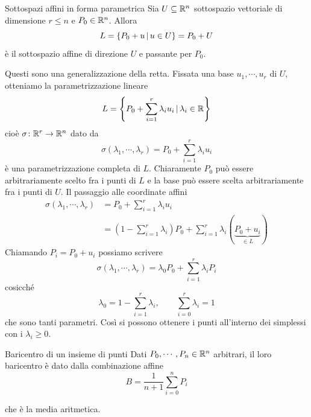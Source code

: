 \documentclass[a4paper]{article}
\begin{document}
\begin{snippetdefinition}{Sottospazi affini in forma parametrica}
    Sia \(U \subseteq \mathbb{R}^n\) sottospazio vettoriale di dimensione \(r \leq n\)
    e \(P_0 \in \mathbb{R}^n\).
    Allora
    \[
        L = \left\{
            P_0 + u \,|\, u \in U
        \right\} = P_0 + U
    \]
    è il sottospazio affine
    di direzione \(U\) e passante per \(P_0\).
\end{snippetdefinition}

Questi sono una generalizzazione della retta.
Fissata una base \(u_1, \cdots, u_r\) di \(U\),
otteniamo la parametrizzazione lineare
\[
    L = \left\{
        P_0 + \sum_{i=1}^r \lambda_i u_i
        \,|\, \lambda_i \in \mathbb{R}
    \right\}
\]
cioè \(\sigma \colon \mathbb{R}^r \to \mathbb{R}^n\)
dato da
\[
    \sigma(\lambda_1, \cdots, \lambda_r) = P_0 + \sum_{i=1}^r \lambda_i u_i
\]
è una parametrizzazione completa di \(L\).
Chiaramente \(P_0\) può essere arbitrariamente scelto fra i punti di \(L\)
e la base può essere scelta arbitrariamente fra i punti di \(U\).
Il passaggio alle coordinate affini
\begin{align*}
    \sigma(\lambda_1, \cdots, \lambda_r)
    &= P_0 + \sum_{i=1}^r \lambda_i u_i \\
    &= \left(1 - \sum_{i=1}^r \lambda_i\right) P_0
    + \sum_{i=1}^r \lambda_i(\underbrace{P_0 + u_i}_{\in L})
\end{align*}
Chiamando \(P_i = P_0 + u_i\) possiamo scrivere
\[
    \sigma(\lambda_1, \cdots, \lambda_r) = \lambda_0 P_0 + \sum_{i=1}^r \lambda_i P_i
\]
cosicché
\[
    \lambda_0 = 1-\sum_{i=1}^r\lambda_i,
    \qquad
    \sum_{i=0}^r \lambda_i = 1
\]
che sono tanti parametri.
Così si possono ottenere i punti all'interno dei simplessi con i \(\lambda_i \geq 0\).

\begin{snippetdefinition}{Baricentro di un insieme di punti}
    Dati \(P_0, \cdots, P_n \in \mathbb{R}^n\) arbitrari, il loro baricentro
    è dato dalla combinazione affine
    \[
        B = \frac{1}{n+1} \sum_{i=0}^n P_i
    \]
\end{snippetdefinition}
che è la media aritmetica.
\end{document}
